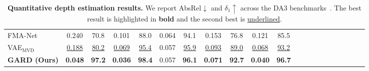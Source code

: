 \documentclass{llmxive}
\begin{document}
\begin{table}[h]
{\begin{tabular}{lccccc ccccc ccccc ccccc}
FMA-Net~\cite{Youk_2024_CVPR}
& 0.240 &    70.8
& 0.101 &    88.0
& 0.064 &    94.1
& 0.153 &    76.8
& 0.121 &    85.5
\\



VAE$_\text{MVD}$
& \underline{0.188} & \underline{80.2}
& \underline{0.069} & \underline{95.4}
& {0.057} & \underline{95.9}
& \underline{0.093} & \underline{89.0}
& \underline{0.068} & \underline{93.2} \\


\textbf{GARD (Ours)}
& \textbf{0.048} & \textbf{97.2}
& \textbf{0.036} & \textbf{98.4}
& {0.057} & \textbf{96.1}
& \textbf{0.071} & \textbf{92.7}
& \textbf{0.040} & \textbf{96.7}  \\


\bottomrule
\end{tabular}
}
\caption{\textbf{Quantitative depth estimation results.} We report AbsRel$\downarrow$ and $\delta_1\uparrow$ across the DA3 benchmarks~\cite{depthanything3}. The best result is highlighted in \textbf{bold} and the second best is \underline{underlined}.}
\label{supple_tab:da3_giant_depth}
\end{table}
\end{document}

